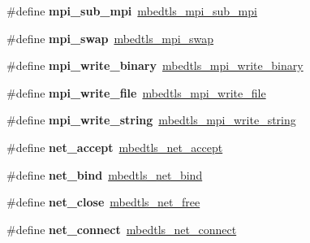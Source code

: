 \begin{DoxyCompactItemize}
\#define {\bfseries mpi\+\_\+sub\+\_\+mpi}~\mbox{\hyperlink{bignum_8h_a1a38a8d9f5052491df94d8010bd34955}{mbedtls\+\_\+mpi\+\_\+sub\+\_\+mpi}}
\item 
\mbox{\label{compat-1_83_8h_a1aaba0275963845bc2af8accbcbcac98}} 
\#define {\bfseries mpi\+\_\+swap}~\mbox{\hyperlink{bignum_8h_a60d0c82301d6cf50e69808b6a3c5cd63}{mbedtls\+\_\+mpi\+\_\+swap}}
\item 
\mbox{\label{compat-1_83_8h_a9ef615b5383702ad425e2ed35dd59dab}} 
\#define {\bfseries mpi\+\_\+write\+\_\+binary}~\mbox{\hyperlink{bignum_8h_aceb4aeeb376a582a5e904135205ada44}{mbedtls\+\_\+mpi\+\_\+write\+\_\+binary}}
\item 
\mbox{\label{compat-1_83_8h_aad30b7a2a8e62fb03aa49e6b12806dd3}} 
\#define {\bfseries mpi\+\_\+write\+\_\+file}~\mbox{\hyperlink{bignum_8h_ab23e312f4a0479c8b63a4bc9328e1324}{mbedtls\+\_\+mpi\+\_\+write\+\_\+file}}
\item 
\mbox{\label{compat-1_83_8h_a0c7019d5ac78b5f35020a4cdd9260da7}} 
\#define {\bfseries mpi\+\_\+write\+\_\+string}~\mbox{\hyperlink{bignum_8h_ab2197e4833449c3e505ec8d11b348913}{mbedtls\+\_\+mpi\+\_\+write\+\_\+string}}
\item 
\mbox{\label{compat-1_83_8h_a25e1a46a7effc2443d0a604239054962}} 
\#define {\bfseries net\+\_\+accept}~\mbox{\hyperlink{net__sockets_8h_a2f862b9086f3466593d5cf399b2c98c6}{mbedtls\+\_\+net\+\_\+accept}}
\item 
\mbox{\label{compat-1_83_8h_ac096ffa8e602ae107bf556d2b19d65d3}} 
\#define {\bfseries net\+\_\+bind}~\mbox{\hyperlink{net__sockets_8h_aa1cb7fc819153c43a2c75c95d0152c75}{mbedtls\+\_\+net\+\_\+bind}}
\item 
\mbox{\label{compat-1_83_8h_a9f0717abc57efc12d16a00b971468472}} 
\#define {\bfseries net\+\_\+close}~\mbox{\hyperlink{net__sockets_8h_a77c35cb3f4b9fe6035d1d3742f3b4a24}{mbedtls\+\_\+net\+\_\+free}}
\item 
\mbox{\label{compat-1_83_8h_a764b69005357495dbfe6b39d77d31c03}} 
\#define {\bfseries net\+\_\+connect}~\mbox{\hyperlink{net__sockets_8h_ac12c400864a5aad46666828ce2a089a4}{mbedtls\+\_\+net\+\_\+connect}}

\end{DoxyCompactItemize}
